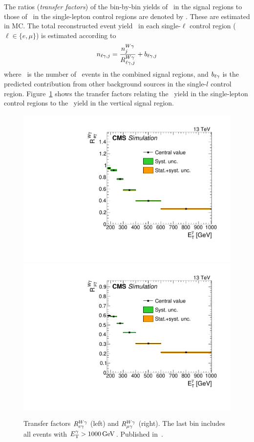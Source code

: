 The ratios (\textit{transfer factors}) of the bin-by-bin yields of \wlng\ in the signal regions to those
of \wlng\ in the single-lepton control regions are denoted by \RWl[,j]. These are estimated in MC.
The total reconstructed event yield \nl\ in each single-$\ell$ control region ($\ell \in \{e,\mu\}$) is estimated according to
\begin{equation}
  \nl[,j] = \frac{\nWg[j]}{\RWl[,j]} + b_{\ell\Pgamma,j}
\end{equation}
where \nWg\ is the number of \wlng\ events in the combined signal regions, and
$b_{\ell\Pgamma}$ is the predicted contribution from other background sources in the single-$l$ control region.
Figure~\ref{fig:tf_w} shows the transfer factors relating the \wlng\ yield in the single-lepton control regions to the \wlng\ yield in the
vertical signal region.

\begin{figure}[htbp]
  \begin{center}
    \includegraphics[width=0.48\linewidth]{Figures/exo16053/Figure_003-a}
    \includegraphics[width=0.48\linewidth]{Figures/exo16053/Figure_003-b}
    \caption{
          Transfer factors $R^{\PW\Pgamma}_{\Pe\Pgamma}$ (left) and $R^{\PW\Pgamma}_{\Pmu\Pgamma}$ (right). The last bin includes all events with $\ETgamma > 1000\unit{GeV}$.
          Published in~\cite{ref:JHEP02(2019)074}.
    }
    \label{fig:tf_w}
  \end{center}
\end{figure}

